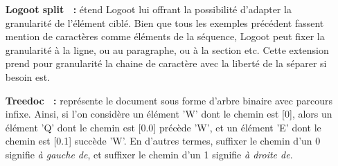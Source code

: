 \begin{itemize}
\item [\textbf{Logoot split~\cite{mehdi2014merging} :}] étend Logoot lui offrant
  la possibilité d'adapter la granularité de l'élément ciblé. Bien que tous les
  exemples précédent fassent mention de caractères comme éléments de la
  séquence, Logoot peut fixer la granularité à la ligne, ou au paragraphe, ou à
  la section etc. Cette extension prend pour granularité la chaine de caractère
  avec la liberté de la séparer si besoin est. 

\item [\textbf{Treedoc~\cite{shapiro2011comprehensive} :}] représente le
  document sous forme d'arbre binaire avec parcours infixe.  Ainsi, si l'on
  considère un élément 'W' dont le chemin est [0], alors un élément 'Q' dont le
  chemin est [0.0] précède 'W', et un élément 'E' dont le chemin est [0.1]
  succède 'W'. En d'autres termes, suffixer le chemin d'un 0 signifie \emph{à
    gauche de}, et suffixer le chemin d'un 1 signifie \emph{à droite de}.
\end{itemize}


